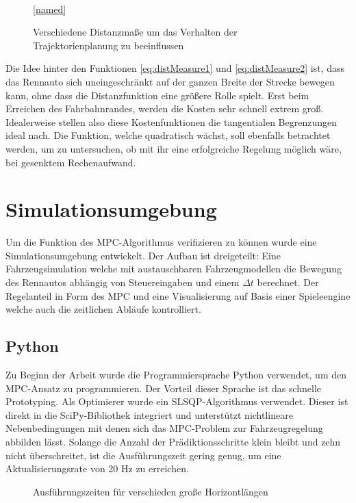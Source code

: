 \documentclass{like}
\begin{document}
\begin{figure}[ht!]
	\centering
	 
	\\
	\ref{named}
	\caption{Verschiedene Distanzmaße um das Verhalten der Trajektorienplanung zu beeinflussen}
	\label{fig:elasticCost}
\end{figure}

Die Idee hinter den Funktionen \ref{eq:distMeasure1} und \ref{eq:distMeasure2} ist, dass das Rennauto sich uneingeschränkt auf der ganzen Breite der Strecke bewegen kann, ohne dass die Distanzfunktion eine größere Rolle spielt. Erst beim Erreichen des Fahrbahnrandes, werden die Kosten sehr schnell extrem groß. Idealerweise stellen also diese Kostenfunktionen die tangentialen Begrenzungen ideal nach. Die Funktion, welche quadratisch wächst, soll ebenfalls betrachtet werden, um zu untersuchen, ob mit ihr eine erfolgreiche Regelung möglich wäre, bei gesenktem Rechenaufwand. 



\chapter{Simulationsumgebung}
Um die Funktion des \ac{MPC}-Algorithmus verifizieren zu können wurde eine Simulationsumgebung entwickelt. Der Aufbau ist dreigeteilt: Eine Fahrzeugsimulation welche mit austauschbaren Fahrzeugmodellen die Bewegung des Rennautos abhängig von Steuereingaben und einem $\Delta t$ berechnet. Der Regelanteil in Form des \ac{MPC} und eine Visualisierung auf Basis einer Spieleengine welche auch die zeitlichen Abläufe kontrolliert. 



\section{Python}

Zu Beginn der Arbeit wurde die Programmiersprache Python verwendet, um den \ac{MPC}-Ansatz zu programmieren. Der Vorteil dieser Sprache ist das schnelle Prototyping. Als Optimierer wurde ein \ac{SLSQP}-Algorithmus verwendet. Dieser ist direkt in die SciPy-Bibliothek \cite{Scipy} integriert und unterstützt nichtlineare Nebenbedingungen mit denen sich das \ac{MPC}-Problem zur Fahrzeugregelung abbilden lässt. Solange die Anzahl der Prädiktionsschritte klein bleibt und zehn nicht überschreitet, ist die Ausführungszeit gering genug, um eine Aktualisierungsrate von 20 Hz zu erreichen. 

\begin{figure}[ht!]
	\centering
	 
	\caption{Ausführungszeiten für verschieden  große Horizontlängen}
	\label{fig:pythonBench}
\end{figure}
\end{document}
